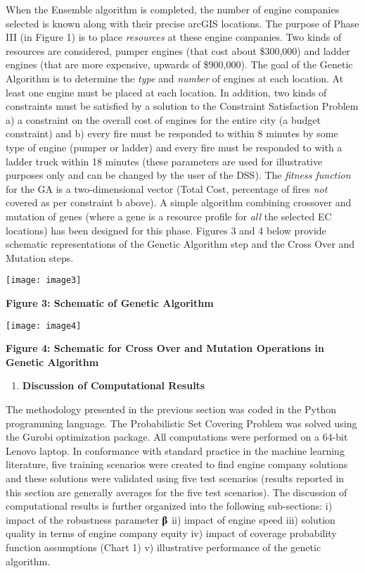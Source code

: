 \documentclass{article} %
\begin{document}
\noindent When the Ensemble algorithm is completed, the number of engine companies selected is known along with their precise arcGIS locations.  The purpose of Phase III (in Figure 1) is to place \textit{resources} at these engine companies.  Two kinds of resources are considered, pumper engines (that cost about \$300,000) and ladder engines (that are more expensive, upwards of \$900,000).  The goal of the Genetic Algorithm is to determine the \textit{type} and \textit{number} of engines at each location.  At least one engine must be placed at each location.  In addition, two kinds of constraints must be satisfied by a solution to the Constraint Satisfaction Problem a) a constraint on the overall cost of engines for the entire city (a budget constraint) and b) every fire must be responded to within 8 minutes by some type of engine (pumper or ladder) and every fire must be responded to with a ladder truck within 18 minutes (these parameters are used for illustrative purposes only and can be changed by the user of the DSS).  The \textit{fitness function} for the GA is a two-dimensional vector (Total Cost, percentage of fires \textit{not} covered as per constraint b above).   A simple algorithm combining crossover and mutation of genes (where a gene is a resource profile for \textit{all} the selected EC locations) has been designed for this phase. Figures 3 and 4 below provide schematic representations of the Genetic Algorithm step and the Cross Over and Mutation steps.

\noindent \texttt{[image: image3]}

\noindent \textbf{Figure 3: Schematic of Genetic Algorithm}

\noindent 

\noindent \texttt{[image: image4]}

\noindent \textbf{Figure 4: Schematic for Cross Over and Mutation Operations in Genetic Algorithm}

\begin{enumerate}
\item \textbf{ Discussion of Computational Results}
\end{enumerate}

\noindent The methodology presented in the previous section was coded in the Python programming language.  The Probabilistic Set Covering Problem was solved using the Gurobi optimization package.  All computations were performed on a 64-bit Lenovo laptop.  In conformance with standard practice in the machine learning literature, five training scenarios were created to find engine company solutions and these solutions were validated using five test scenarios (results reported in this section are generally averages for the five test scenarios).  The discussion of computational results is further organized into the following sub-sections: i) impact of the robustness parameter \textbf{$\boldsymbol{\betaup}$} ii) impact of engine speed iii) solution quality in terms of engine company equity iv) impact of coverage probability function assumptions (Chart 1) v) illustrative performance of the genetic algorithm.
\end{document}
